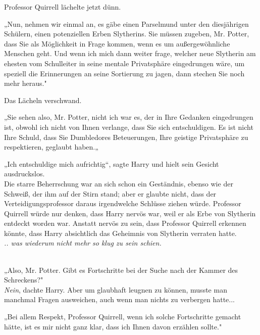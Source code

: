 {Professor Quirrell lächelte jetzt dünn.

„Nun, nehmen wir einmal an, es gäbe einen Parselmund unter den diesjährigen Schülern, einen potenziellen Erben Slytherins. Sie müssen zugeben, Mr. Potter, dass Sie als Möglichkeit in Frage kommen, wenn es um außergewöhnliche Menschen geht. Und wenn ich mich dann weiter frage, welcher neue Slytherin am ehesten vom Schulleiter in seine mentale Privatsphäre eingedrungen wäre, um speziell die Erinnerungen an seine Sortierung zu jagen, dann stechen Sie noch mehr heraus."

Das Lächeln verschwand.

„Sie sehen also, Mr. Potter, nicht ich war es, der in Ihre Gedanken eingedrungen ist, obwohl ich nicht von Ihnen verlange, dass Sie sich entschuldigen. Es ist nicht Ihre Schuld, dass Sie Dumbledores Beteuerungen, Ihre geistige Privatsphäre zu respektieren, geglaubt haben.„

„Ich entschuldige mich aufrichtig“, sagte Harry und hielt sein Gesicht ausdruckslos.\\ Die starre Beherrschung war an sich schon ein Geständnis, ebenso wie der Schweiß, der ihm auf der Stirn stand; aber er glaubte nicht, dass der Verteidigungsprofessor daraus irgendwelche Schlüsse ziehen würde. Professor Quirrell würde nur denken, dass Harry nervös war, weil er als Erbe von Slytherin entdeckt worden war. Anstatt nervös zu sein, dass Professor Quirrell erkennen könnte, dass Harry absichtlich das Geheimnis von Slytherin verraten hatte.\\ \emph{.. was wiederum nicht mehr so klug zu sein schien.\\ }\strut \\ „Also, Mr. Potter. Gibt es Fortschritte bei der Suche nach der Kammer des Schreckens?"\\ \emph{Nein}, dachte Harry. Aber um glaubhaft leugnen zu können, musste man manchmal Fragen ausweichen, auch wenn man nichts zu verbergen hatte...

„Bei allem Respekt, Professor Quirrell, wenn ich solche Fortschritte gemacht hätte, ist es mir nicht ganz klar, dass ich Ihnen davon erzählen sollte."

}
